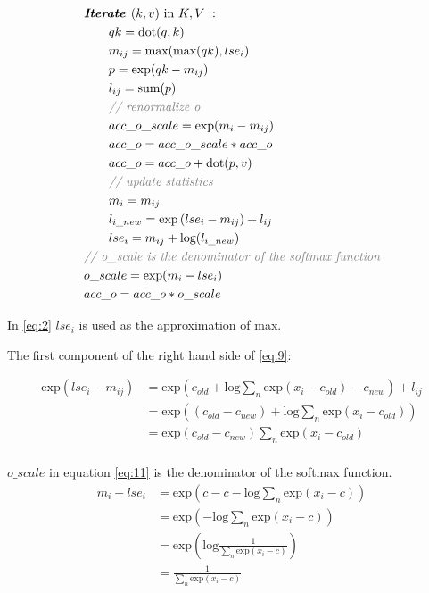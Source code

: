 \begin{align}
    &\textbf{\textit{Iterate }} (k,v)\ \text{in} \ K,V\ : \nonumber\\
    &\qquad qk = \text{dot}(q,k) \\
    &\qquad m_{ij} = \text{max}(\text{max}(qk), lse_i) \label{eq:2}\\
    &\qquad p = \text{exp}(qk-m_{ij}) \\
    &\qquad l_{ij} = \text{sum}(p) \\
    &\qquad \textcolor{grey}{\textit{// renormalize o}} \nonumber\\
    &\qquad acc\_o\_scale = \text{exp}(m_i - m_{ij}) \\
    &\qquad acc\_o = acc\_o\_scale * acc\_o \\
    &\qquad acc\_o = acc\_o+\text{dot}(p, v)  \\
    &\qquad \textcolor{grey}{\textit{// update statistics}} \nonumber\\
    &\qquad m_{i} = m_{ij} \\
    &\qquad l_{{i}\_{new}} = \text{exp}\left( lse_i - m_{ij}\right) + l_{ij} \label{eq:9}\\
    &\qquad lse_{i} = m_{ij} + \text{log}(l_{i\_new}) \\
    &\textcolor{grey}{\textit{// o\_scale is the denominator of the softmax function}} \nonumber\\
    & o\_scale = \text{exp}(m_i - lse_i) \label{eq:11}\\
    &acc\_o = acc\_o * o\_scale
\end{align}

In \cref{eq:2} $lse_i$ is used as the approximation of max.

The first component of the right hand side of \cref{eq:9}:

\begin{align*}
    \text{exp}\left( lse_i - m_{ij} \right)&= \text{exp}\left(c_{old} + \text{log}\sum_{n}\text{exp}(x_i - c_{old}) - c_{new}\right) +l_{ij}\\
    &= \text{exp} \left( \left(c_{old}-c_{new}\right) + \text{log}\sum_{n}\text{exp}(x_i - c_{old}) \right) \\
    &= \text{exp}\left( c_{old} - c_{new}\right)\sum_{n}\text{exp}(x_i - c_{old})\\
\end{align*}

$o\_scale$ in equation \cref{eq:11} is the denominator of the softmax function.
\begin{align*}
m_i - lse_i&= \text{exp} \left(c - c - \text{log}\sum_{n}\text{exp}(x_i - c)\right) \\
&= \text{exp} \left(- \text{log}\sum_{n}\text{exp}(x_i - c)\right)\\
&= \text{exp} \left(\text{log}\frac{1}{\sum_{n}\text{exp}(x_i - c)}\right)\\
&=\frac{1}{\sum_{n}\text{exp}(x_i - c)}
\end{align*}

